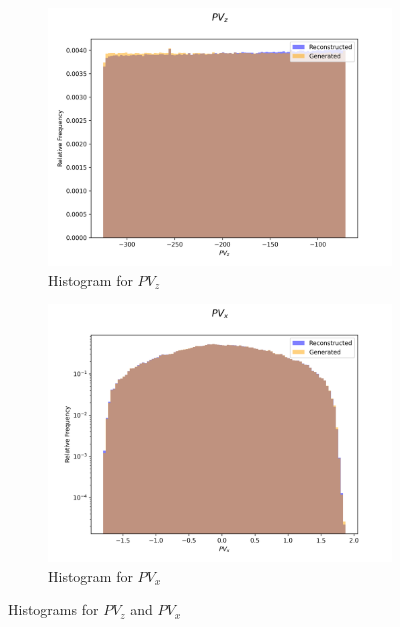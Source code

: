 \documentclass{article}
\begin{document}
\begin{figure}[H]
    \centering
    \begin{subfigure}[b]{0.45\textwidth}
        \includegraphics[width=\textwidth]{graphs/incl_PV_z.png}
        \caption{Histogram for $PV_z$}
        \label{fig:incl_PV_z}
    \end{subfigure}
    \hfill
    \begin{subfigure}[b]{0.45\textwidth}
        \includegraphics[width=\textwidth]{graphs/incl_PV_x.png}
        \caption{Histogram for $PV_x$}
        \label{fig:incl_PV_x}
    \end{subfigure}
    \caption{Histograms for $PV_z$ and $PV_x$}
\end{figure}
\end{document}
